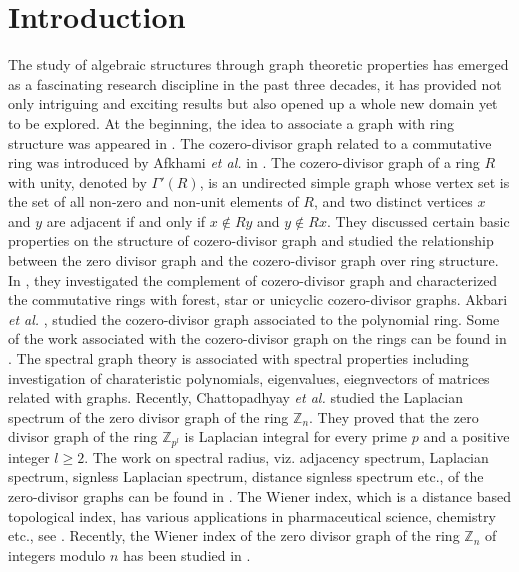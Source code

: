 \documentclass{amsart}
\theoremstyle{plain}
\theoremstyle{definition}
\theoremstyle{remark}
\begin{document}
\section{Introduction}
The study of algebraic structures through graph theoretic properties has emerged as a fascinating research discipline in the past three decades, it has provided not only intriguing and exciting results but also opened up a whole new
domain yet to be explored. At the beginning, the idea to associate a graph with  ring structure was appeared in \cite{beck1988coloring}. The cozero-divisor graph related to a commutative ring was introduced by Afkhami \emph{et al.} in \cite{afkhami2011cozero}. The cozero-divisor graph of a ring $R$ with unity, denoted by
$\Gamma'(R)$, is an undirected simple graph whose vertex set is  the set of all
non-zero and non-unit elements of $R$, and two distinct vertices $x$ and $y$  are adjacent if and only if $x \notin Ry$ and $y \notin Rx$. They discussed certain basic properties on the structure of cozero-divisor graph and studied the relationship between the zero divisor graph and the cozero-divisor graph over ring structure. In \cite{afkhami2012cozero}, they investigated the complement of cozero-divisor graph and characterized the commutative rings with forest, star or unicyclic cozero-divisor graphs. Akbari \emph{et al.} \cite{akbari2014some}, studied the cozero-divisor graph associated to the polynomial ring. Some of the work associated with the cozero-divisor graph on the rings can be found in \cite{afkhami2012planar, afkhami2013cozero, akbari2014commutative, bakhtyiari2020coloring, mallika2017rings, nikandish2021metric}. The spectral graph theory is associated with spectral properties including investigation of charateristic polynomials, eigenvalues, eiegnvectors of matrices related with graphs. Recently, Chattopadhyay \emph{et al.} \cite{chattopadhyay2020laplacian} studied the Laplacian spectrum of the zero divisor graph of the ring $\mathbb{Z}_n$. They proved that the zero divisor graph of the ring $\mathbb{Z}_{p^l}$ is Laplacian integral for every prime $p$ and a positive integer $l \geq 2$. The work on spectral radius, viz. adjacency spectrum, Laplacian spectrum, signless Laplacian spectrum, distance signless spectrum etc.,  of the zero-divisor graphs can be found in \cite{chattopadhyay2020laplacian,magi2020spectrum, patil2021spectrum, pirzada2021signless, pirzada2020distance, pirzada2021normalized, rather2021laplacian}. The Wiener index, which is a distance based topological index, has various applications in pharmaceutical science, chemistry etc., see \cite{dobrynin2001wiener, janezic2015graph,wiener1947structural, xu2014survey}. Recently, the Wiener index of the zero divisor graph of the ring $\mathbb{Z}_n$ of integers modulo $n$ has been studied in \cite{asir2021wiener}.  
\end{document}
